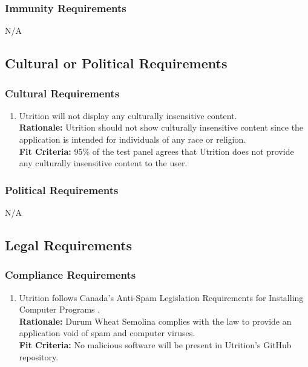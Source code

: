 \documentclass[12pt]{article}
\begin{document}
\subsubsection{Immunity Requirements}
\hspace{1.5cm}N/A 

\subsection{Cultural or Political Requirements}

\subsubsection{Cultural Requirements}

\begin{enumerate}[{CP}1. ] 
	\item Utrition will not display any culturally insensitive content. \\
	\textbf{Rationale:} Utrition should not show culturally insensitive content since the application is intended for individuals of any race or religion.\\	
	\textbf{Fit Criteria:} 95\% of the test panel agrees that Utrition does not provide any culturally insensitive content to the user.
\end{enumerate}

\subsubsection{Political Requirements}
\hspace{1.5cm}N/A

\subsection{Legal Requirements}
\subsubsection{Compliance Requirements}
\begin{enumerate}[{LR}1. ]
	\item Utrition follows Canada’s Anti-Spam Legislation Requirements for Installing Computer Programs \citep{CanadianInstall}.\\
	\textbf{Rationale:} Durum Wheat Semolina complies with the law to provide an application void of spam and computer viruses.\\
	\textbf{Fit Criteria:} No malicious software will be present in Utrition’s GitHub repository.
\end{enumerate}
\end{document}
